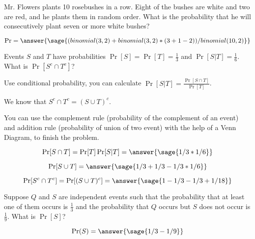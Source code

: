 \documentclass{ximera}
\begin{document}
\begin{problem}
Mr. Flowers plants 10 rosebushes in a row. Eight of the bushes are white and two are red, and he plants them in random order. What is the probability that he will consecutively plant seven or more white bushes? 
\begin{hint}
\end{hint}

\begin{prompt}
$$\Pr=\answer{\sage{(binomial(3,2)+binomial(3,2)*(3+1-2))/binomial(10,2)}}$$
\end{prompt}

\end{problem}

\begin{problem}
 Events $S$ and $T$ have probabilities $\Pr[S] = \Pr[T] =\frac{1}{3}$ and $\Pr[S|T] =\frac{1}{6} $. What is $\Pr[S^c\cap T^c]$?
\begin{hint}
    \item Use conditional probability, you can calculate $\Pr[S|T]=\frac{\Pr[S \cap T]}{\Pr[T]}$.     \item We know that $S^c\cap T^c=(S\cup T)^c$. 
    \item You can use the complement rule (probability of the complement of an event) and addition rule (probability of union of two event) with the help of a Venn Diagram, to finish the problem.
\end{hint}

\begin{prompt}
$$
\Pr[S \cap T]=\Pr[T]\Pr[S|T]=\answer{\sage{1/3*1/6}}
$$ 

$$
\Pr[S \cup T]=\answer{\sage{1/3+1/3-1/3*1/6}}
$$ 

$$
\Pr[S^c \cap T^c]=\Pr[(S \cup T)^c]=\answer{\sage{1-1/3-1/3+1/18}}
$$
\end{prompt}

\end{problem}

\begin{problem}
Suppose $Q$ and $S$ are independent events such that the probability that at least one of them occurs is $\frac{1}{3}$ and the probability that $Q$ occurs but $S$ does not occur is $\frac{1}{9}$. What is $\Pr[S]$?

\begin{prompt}
$$\Pr(S)=\answer{\sage{1/3-1/9}}$$
\end{prompt}

\end{problem}
\end{document}
